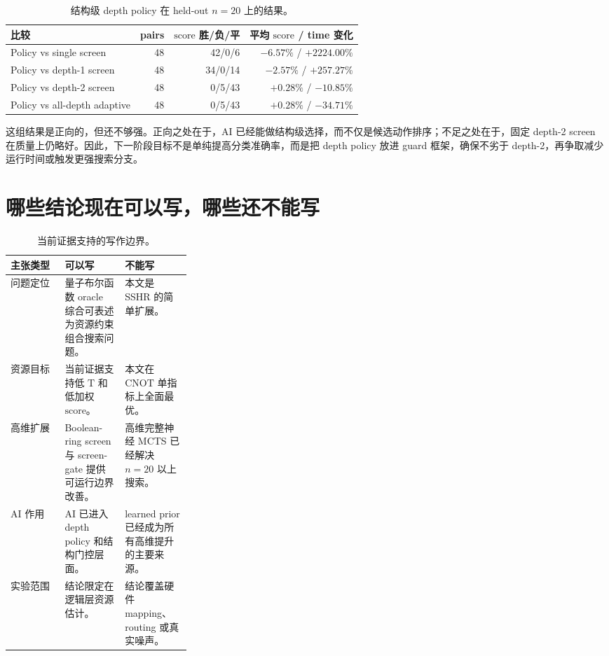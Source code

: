 \documentclass[UTF8,fontset=macnew,11pt]{ctexart}
\newcommand{\score}{\ensuremath{\mathrm{score}}}
\newcommand{\cnot}{\ensuremath{\mathrm{CNOT}}}
\newcommand{\tcount}{\ensuremath{\mathrm{T}}}
\begin{document}
\begin{table}[t]
\centering
\small
\caption{结构级 depth policy 在 held-out $n=20$ 上的结果。}
\label{tab:depth_policy}
\begin{tabularx}{\linewidth}{>{\raggedright\arraybackslash}Xrrr}
\toprule
比较 & pairs & \score{} 胜/负/平 & 平均 \score{} / time 变化 \\
\midrule
Policy vs single screen & 48 & 42/0/6 & $-6.57\%$ / $+2224.00\%$ \\
Policy vs depth-1 screen & 48 & 34/0/14 & $-2.57\%$ / $+257.27\%$ \\
Policy vs depth-2 screen & 48 & 0/5/43 & $+0.28\%$ / $-10.85\%$ \\
Policy vs all-depth adaptive & 48 & 0/5/43 & $+0.28\%$ / $-34.71\%$ \\
\bottomrule
\end{tabularx}
\end{table}

这组结果是正向的，但还不够强。正向之处在于，AI 已经能做结构级选择，而不仅是候选动作排序；不足之处在于，固定 depth-2 screen 在质量上仍略好。因此，下一阶段目标不是单纯提高分类准确率，而是把 depth policy 放进 guard 框架，确保不劣于 depth-2，再争取减少运行时间或触发更强搜索分支。

\section{哪些结论现在可以写，哪些还不能写}

\begin{table}[t]
\centering
\small
\caption{当前证据支持的写作边界。}
\label{tab:claim_boundary}
\begin{tabularx}{\linewidth}{>{\raggedright\arraybackslash}p{0.30\linewidth}XX}
\toprule
主张类型 & 可以写 & 不能写 \\
\midrule
问题定位 & 量子布尔函数 oracle 综合可表述为资源约束组合搜索问题。 & 本文是 SSHR 的简单扩展。 \\
资源目标 & 当前证据支持低 \tcount{} 和低加权 \score{}。 & 本文在 \cnot{} 单指标上全面最优。 \\
高维扩展 & Boolean-ring screen 与 screen-gate 提供可运行边界改善。 & 高维完整神经 MCTS 已经解决 $n=20$ 以上搜索。 \\
AI 作用 & AI 已进入 depth policy 和结构门控层面。 & learned prior 已经成为所有高维提升的主要来源。 \\
实验范围 & 结论限定在逻辑层资源估计。 & 结论覆盖硬件 mapping、routing 或真实噪声。 \\
\bottomrule
\end{tabularx}
\end{table}
\end{document}
